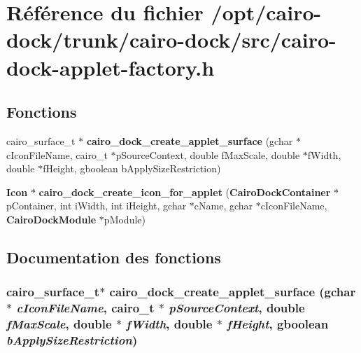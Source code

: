 \section{Référence du fichier /opt/cairo-dock/trunk/cairo-dock/src/cairo-dock-applet-factory.h}
\label{cairo-dock-applet-factory_8h}
\subsection*{Fonctions}
\begin{CompactItemize}
\item 
cairo\_\-surface\_\-t $\ast$ {\bf cairo\_\-dock\_\-create\_\-applet\_\-surface} (gchar $\ast$cIconFileName, cairo\_\-t $\ast$pSourceContext, double fMaxScale, double $\ast$fWidth, double $\ast$fHeight, gboolean bApplySizeRestriction)
\item 
{\bf Icon} $\ast$ {\bf cairo\_\-dock\_\-create\_\-icon\_\-for\_\-applet} ({\bf CairoDockContainer} $\ast$pContainer, int iWidth, int iHeight, gchar $\ast$cName, gchar $\ast$cIconFileName, {\bf CairoDockModule} $\ast$pModule)
\end{CompactItemize}


\subsection{Documentation des fonctions}
\subsubsection{\setlength{\rightskip}{0pt plus 5cm}cairo\_\-surface\_\-t$\ast$ cairo\_\-dock\_\-create\_\-applet\_\-surface (gchar $\ast$ {\em cIconFileName}, cairo\_\-t $\ast$ {\em pSourceContext}, double {\em fMaxScale}, double $\ast$ {\em fWidth}, double $\ast$ {\em fHeight}, gboolean {\em bApplySizeRestriction})}\label{cairo-dock-applet-factory_8h_eae3d51600a868ecf56f95a64df24539}


